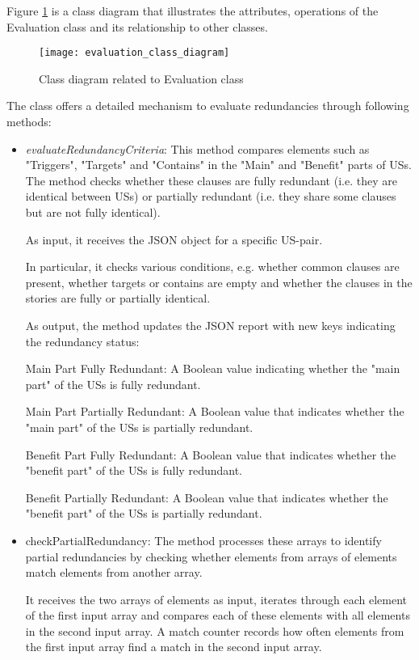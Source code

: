 Figure \ref{fig:evaluation_class_diagram} is a class diagram that illustrates the attributes, operations of the Evaluation class and its relationship to other classes.
\begin{figure}[h]
	\centering 
	\texttt{[image: evaluation\_class\_diagram]}
	\caption{Class diagram related to Evaluation class}\label{fig:evaluation_class_diagram}
\end{figure} 
The class offers a detailed mechanism to evaluate redundancies through following methods:
\begin{itemize}
	\item\textit{evaluateRedundancyCriteria}: This method compares elements such as "Triggers", "Targets" and "Contains" in the "Main" and "Benefit" parts of USs. The method checks whether these clauses are fully redundant (i.e. they are identical between USs) or partially redundant (i.e. they share some clauses but are not fully identical).
	
	As input, it receives the JSON object for a specific US-pair.
	
	In particular, it checks various conditions, e.g. whether common clauses are present, whether targets or contains are empty and whether the clauses in the stories are fully or partially identical.
	
	As output, the method updates the JSON report with new keys indicating the redundancy status:
	
	Main Part Fully Redundant: A Boolean value indicating whether the "main part" of the USs is fully redundant.
	
	Main Part Partially Redundant: A Boolean value that indicates whether the "main part" of the USs is partially redundant.
	
	Benefit Part Fully Redundant: A Boolean value that indicates whether the "benefit part" of the USs is fully redundant.
	
	Benefit Partially Redundant: A Boolean value that indicates whether the "benefit part" of the USs is partially redundant.
	
	\item checkPartialRedundancy: The method processes these arrays to identify partial redundancies by checking whether elements from arrays of elements match elements from another array. 
	
	It receives the two arrays of elements as input, iterates through each element of the first input array and compares each of these elements with all elements in the second input array. A match counter records how often elements from the first input array find a match in the second input array.
	

\end{itemize}
